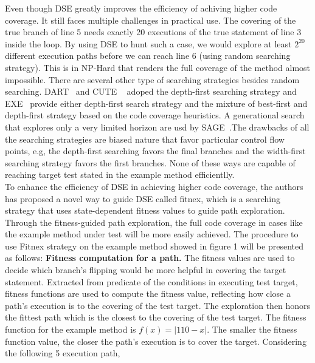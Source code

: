\indent Even though DSE greatly improves the efficiency of achiving higher code coverage. It still faces multiple challenges in practical use. The covering of the true branch of line 5 needs exactly 20 executions of the true statement of line 3 inside the loop. By using DSE to hunt such a case, we would explore at least $2^{20}$ different execution paths before we can reach line 6 (using random searching strategy). This is in NP-Hard that renders the full coverage of the method almost impossible. 
\indent There are several other type of searching strategies besides random searching. DART ~\cite{dart}and CUTE ~\cite{cute} adoped the depth-first searching strategy and EXE ~\cite{exe}provide either depth-first search strategy and the mixture of best-first and depth-first strategy based on the code coverage heuristics. A generational search that explores only a very limited horizon are usd by SAGE~\cite{fuzz}.The drawbacks of all the searching strategies are biased nature that favor particular control flow points, e.g, the depth-first searching favors the final branches and the width-first searching strategy favors the first branches. None of these ways are capable of reaching target test stated in the example method efficientlly.\\
\indent To enhance the efficiency of DSE in achieving higher code coverage, the authors has proposed a novel way to guide DSE called fitnex, which is a searching strategy that uses state-dependent fitness values to guide path exploration. Through the fitness-guided path exploration, the full code coverage in cases like the example method under test will be more easily achieved. The procedure to use Fitnex strategy on the example method showed in figure 1 will be presented as follows:
\indent \textbf{Fitness computation for a path.} The fitness values are used to decide which branch's flipping would be more helpful in covering the target statement. Extracted from predicate of the conditions in executing test target, fitness functions are used to compute the fitness value, reflecting how close a path's execution is to the covering of the test target. The exploration then honors the fittest path which is the closest to the covering of the test target. The fitness function for the example method is $f(x)=|110-x|$. The smaller the fitness function value, the closer the path's execution is to cover the target. Considering the following 5 execution path,\\ 
